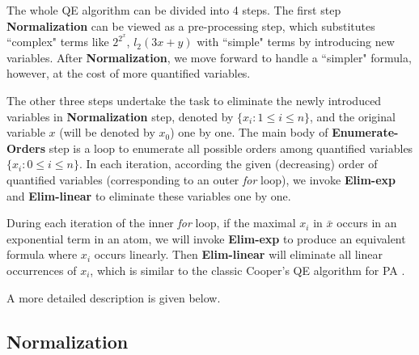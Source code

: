 {The whole QE algorithm can be divided into 4 steps. The first step \textbf{Normalization} can be viewed as a pre-processing step, which substitutes ``complex" terms like $2^{2^x}$, $l_2(3x+y)$ with ``simple" terms by introducing new variables. After \textbf{Normalization}, we move forward to handle a ``simpler" formula, however, at the cost of more quantified variables.

The other three steps undertake the task to eliminate the newly introduced variables in \textbf{Normalization} step, denoted by $\{x_i:1\le i\le n\}$, and the original variable $x$ (will be denoted by $x_0$) one by one. 
The main body of \textbf{Enumerate-Orders} step is a loop to enumerate all possible orders among quantified variables $\{x_i : 0\le i \le n\}$. 
In each iteration, according the given (decreasing) order of quantified variables (corresponding to an outer \emph{for} loop), we invoke \textbf{Elim-exp} and \textbf{Elim-linear} to eliminate these variables one by one. 

During each iteration of the inner \emph{for} loop, if the maximal $x_i$ in $\bar{x}$ occurs in an exponential term in an atom, we will invoke \textbf{Elim-exp} to produce an equivalent formula where $x_i$ occurs linearly. Then \textbf{Elim-linear} will eliminate all linear occurrences of $x_i$, which is similar to the classic Cooper's QE algorithm for PA \cite{Cooper72}. 

A more detailed description is given below.
}

\vspace*{-3mm}
\subsection{Normalization}


